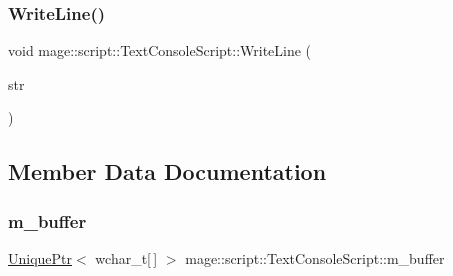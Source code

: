 \hypertarget{classmage_1_1script_1_1_text_console_script_ac8f0361bc1d703b56f1d8be43a32f0ae}{}\label{classmage_1_1script_1_1_text_console_script_ac8f0361bc1d703b56f1d8be43a32f0ae} 
\subsubsection{\texorpdfstring{Write\+Line()}{WriteLine()}}
{\footnotesize\ttfamily void mage\+::script\+::\+Text\+Console\+Script\+::\+Write\+Line (\begin{DoxyParamCaption}\item[{\hyperlink{namespacemage_a8769f9d670d6b585ea306cb1062af94b}{Not\+Null}$<$ \hyperlink{namespacemage_ac409e0f2a22292a3a4cd42742994fbf0}{const\+\_\+wzstring} $>$}]{str }\end{DoxyParamCaption})}



\subsection{Member Data Documentation}
\hypertarget{classmage_1_1script_1_1_text_console_script_a35db160ce89d4ebf6f184d2fe850beab}{}\label{classmage_1_1script_1_1_text_console_script_a35db160ce89d4ebf6f184d2fe850beab} 
\subsubsection{\texorpdfstring{m\+\_\+buffer}{m\_buffer}}
{\footnotesize\ttfamily \hyperlink{namespacemage_a3316d7143a973e37adf1110f2e80ca31}{Unique\+Ptr}$<$ wchar\+\_\+t\mbox{[}$\,$\mbox{]} $>$ mage\+::script\+::\+Text\+Console\+Script\+::m\+\_\+buffer\hspace{0.3cm}{\ttfamily [private]}}

\hypertarget{classmage_1_1script_1_1_text_console_script_a10d396ae897b441a7cfc1f77c50eb16e}{}\label{classmage_1_1script_1_1_text_console_script_a10d396ae897b441a7cfc1f77c50eb16e} 
